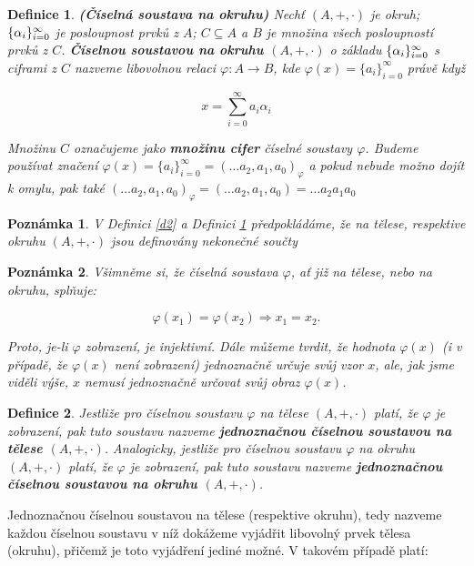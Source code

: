 \documentclass[12pt]{book}
\newtheorem{definice}{Definice}
\newtheorem{pozn}{Poznámka}
\begin{document}
\begin{definice}\label{d3} \textbf{(Číselná soustava na okruhu)}
	Nechť $(A,+,\cdot)$ je okruh; $\{\alpha_i\}_{i=0}^{\infty}$ je posloupnost prvků z $A$; $C\subseteq A$ a $B$ je množina všech posloupností prvků z $C$.
	\textbf{Číselnou soustavou na okruhu $(A,+,\cdot)$} o základu $\{\alpha_i\}_{i=0}^{\infty}$ s ciframi z $C$ nazveme libovolnou relaci $\varphi : A \rightarrow B$, kde 	$\varphi(x)= \{a_{i}\}_{i=0}^{\infty}$ právě když
	
	$$x = \sum_{i=0}^{\infty} a_{i}\alpha_{i}$$
	
	Množinu $C$ označujeme jako \textbf{množinu cifer} číselné soustavy $\varphi$. Budeme používat značení $\varphi(x) = \{a_{i}\}_{i=0}^{\infty} = (\dots a_2,a_1,a_0)_{\varphi}$ a pokud nebude možno dojít k omylu, pak také $(\dots a_2,a_1,a_0)_{\varphi} = (\dots a_2,a_1,a_0) = \dots a_2a_1a_0$
\end{definice}

\begin{pozn}
	V Definici \ref{d2} a Definici \ref{d3} předpokládáme, že na tělese, respektive okruhu $(A,+,\cdot)$ jsou definovány nekonečné součty
\end{pozn}

\begin{pozn}
	Všimněme si, že číselná soustava $\varphi$, ať již na tělese, nebo na okruhu, splňuje:
	
	$$\varphi (x_1) = \varphi(x_2) \Rightarrow x_1 = x_2.$$
	
	Proto, je-li $\varphi$ zobrazení, je injektivní.
	Dále můžeme tvrdit, že hodnota $\varphi(x)$ (i v případě, že $\varphi(x)$ není zobrazení) jednoznačně určuje svůj vzor $x$, ale, jak jsme viděli výše, $x$ nemusí jednoznačně určovat svůj obraz $\varphi(x)$.
	
\end{pozn}

\begin{definice}
	Jestliže pro číselnou soustavu $\varphi$ na tělese $(A,+,\cdot)$ platí, že $\varphi$ je zobrazení, pak tuto soustavu nazveme \textbf{jednoznačnou číselnou soustavou na tělese $(A,+,\cdot)$}. Analogicky, jestliže pro číselnou soustavu $\varphi$ na okruhu $(A,+,\cdot)$ platí, že $\varphi$ je zobrazení, pak tuto soustavu nazveme \textbf{jednoznačnou číselnou soustavou na okruhu $(A,+,\cdot)$}.
\end{definice}

Jednoznačnou číselnou soustavou na tělese (respektive okruhu), tedy nazveme každou číselnou soustavu v níž dokážeme vyjádřit libovolný prvek tělesa (okruhu), přičemž je toto vyjádření jediné možné. V takovém případě platí:	
\end{document}
